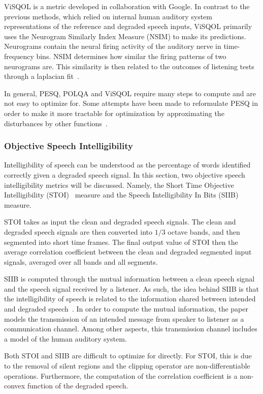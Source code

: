 ViSQOL is a metric developed in collaboration with Google.
In contrast to the previous methods, which relied on internal human auditory system representations of the reference and 
degraded speech inputs, ViSQOL primarily uses the Neurogram Similarly Index Measure (NSIM) to make its predictions.
Neurograms contain the neural firing activity of the auditory nerve in time-frequency bins.
NSIM determines how similar the firing patterns of two neurograms are.
This similarity is then related to the outcomes of listening tests through a laplacian fit~\cite{hines2012visqol}.

In general, PESQ, POLQA and ViSQOL require many steps to compute and are not easy to optimize for.
Some attempts have been made to reformulate PESQ in order to make it more tractable for optimization 
by approximating the disturbances by other functions~\cite{kim2019end}.

\subsubsection{Objective Speech Intelligibility}
Intelligibility of speech can be understood as the percentage of words identified correctly given 
a degraded speech signal.
In this section, two objective speech intelligibility metrics will be discussed.
Namely, the Short Time Objective Intelligibility (STOI)~\cite{taal2011algorithm} measure and the 
Speech Intelligibility In Bits (SIIB)~\cite{van2017instrumental} measure.

STOI takes as input the clean and degraded speech signals.
The clean and degraded speech signals are then converted into $1/3$ octave bands, and then segmented into short time frames.
The final output value of STOI then the average correlation coefficient between the clean and degraded segmented input 
signals, averaged over all bands and all segments.

SIIB is computed through the mutual information between a clean speech signal and the speech signal received by a listener.
As such, the idea behind SIIB is that the intelligibility of speech is related to the information shared between 
intended and degraded speech~\cite{van2017instrumental}.
In order to compute the mutual information, the paper models the transmission of an intended message from 
speaker to listener as a communication channel.
Among other aspects, this transmission channel includes a model of the human auditory system.

Both STOI and SIIB are difficult to optimize for directly. 
For STOI, this is due to the removal of silent regions and the clipping operator are non-differentiable operations.
Furthermore, the computation of the correlation coefficient is a non-convex function of the degraded speech.

